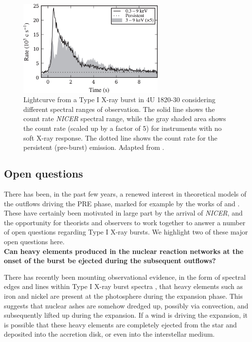 \documentclass[../main.tex]{subfiles}
\newcommand{\Nicer}{\textit{NICER}}
\begin{document}
\begin{figure}
    \centering
    \includegraphics[width=0.65\textwidth]{figures/Keek2018_fig1_mod.jpg}
    \caption{Lightcurve from a Type I X-ray burst in 4U 1820-30 considering different spectral ranges of observation. The solid line shows the count rate {\Nicer} spectral range, while the gray shaded area shows the count rate (scaled up by a factor of 5) for instruments with no soft X-ray response. The dotted line shows the count rate for the persistent (pre-burst) emission. Adapted from \citet{Keek2018a}.}
    \label{fig:keek2018_fig1}
\end{figure}

\subsection{Open questions}
There has been, in the past few years, a renewed interest in theoretical models of the outflows driving the PRE phase, marked for example by the works of \citet{YuHangWeinberg2018} and \citet{Herrera2020}. These have certainly been motivated in large part by the arrival of \Nicer, and the opportunity for theorists and observers to work together to answer a number of open questions regarding Type I X-ray bursts. We highlight two of these major open questions here.\\

\noindent \textbf{Can heavy elements produced in the nuclear reaction networks at the onset of the burst be ejected during the subsequent outflows?}

There has recently been mounting observational evidence, in the form of spectral edges and lines within Type I X-ray burst spectra \citep{IntZand2010,Kajava2017,Strohmayer2019}, that heavy elements such as iron and nickel are present at the photosphere during the expansion phase. This suggests that nuclear ashes are somehow dredged up, possibly via convection, and subsequently lifted up during the expansion. If a wind is driving the expansion, it is possible that these heavy elements are completely ejected from the star and deposited into the accretion disk, or even into the interstellar medium. \\
\end{document}
